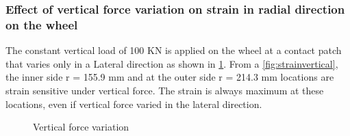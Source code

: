 \documentclass[]{interact}
\theoremstyle{plain}%
\theoremstyle{definition}
\theoremstyle{remark}
\begin{document}
\subsubsection{Effect of vertical force variation on strain in radial direction on the wheel}
The constant vertical load of 100 KN is applied on the wheel at a contact patch that varies only in a Lateral direction as shown in                     \cref{fig:verticalforcevariation}. From a \cref{fig:strainvertical}, the inner side r = 155.9 mm and at the outer side r = 214.3 mm locations are strain sensitive under vertical force. The strain is always maximum at these locations, even if vertical force varied in the lateral direction.
\begin{figure}[h]
\centering
{}
\caption{ Vertical force variation} \label{fig:verticalforcevariation}
\end{figure}
\end{document}
